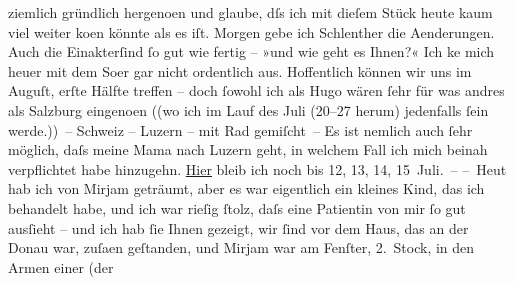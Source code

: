 \begin{ledgroupsized}[t]{13cm}
               ziemlich gründlich hergeno{\geminationm}en und glaube, dſs ich mit
               dieſem Stück heute kaum viel weiter ko{\geminationm}en könnte als es
               iſt. Morgen gebe ich Schlenther die Aenderungen.
               Auch die Einakterſind ſo gut wie fertig – »und wie geht es
               Ihnen?«\pend
           \pstart
           Ich ke{\geminationn} mich heuer mit dem So{\geminationm}er gar nicht ordentlich aus. Hoffentlich können wir uns
               im Auguſt, erſte Hälfte treffen – doch ſowohl \introOben{}ich\introOben{} als Hugo wären ſehr für was {\pb}andres als Salzburg
                  eingeno{\geminationm}en \introOben{}(\introOben{}(wo ich im Lauf
               des Juli (20–27 herum) jedenfalls ſein
               werde.)) – Schweiz – Luzern – mit Rad gemiſcht –\pend
           \pstart
           Es ist nemlich auch ſehr möglich, daſs meine Mama nach Luzern geht, in
               welchem Fall ich mich beinah verpflichtet habe hinzugehn. \uline{Hier} bleib ich noch bis 12, 13, 14, 15 Juli. –\pend
           \pstart
           – Heut hab ich von Mirjam geträumt, aber es war
               eigentlich ein kleines Kind, das ich behandelt habe, und ich {\pb}war rieſig ſtolz, daſs eine Patientin von mir ſo gut
               ausſieht – und ich hab ſie Ihnen gezeigt, wir ſind vor dem Haus, das an der Donau war, zuſa{\geminationm}en geſtanden,
               und Mirjam war am Fenſter, 2. Stock, in den Armen
               einer \label{K_L00809_1v}\label{K_L00809_1h} (\introOben{}der\introOben{}{ }\label{K_L00809_2v}
\end{ledgroupsized}
